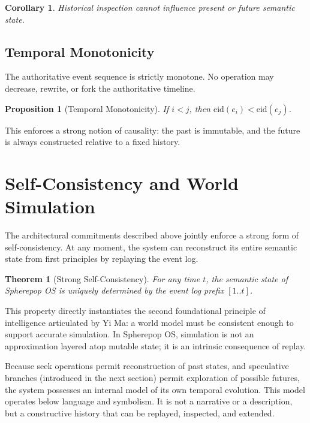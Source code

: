 \documentclass[11pt]{article}
\newtheorem{proposition}{Proposition}[section]
\newtheorem{theorem}{Theorem}[section]
\newtheorem{corollary}{Corollary}[section]
\begin{document}
\begin{corollary}
Historical inspection cannot influence present or future semantic state.
\end{corollary}

\subsection{Temporal Monotonicity}

The authoritative event sequence is strictly monotone. No operation may
decrease, rewrite, or fork the authoritative timeline.

\begin{proposition}[Temporal Monotonicity]
If $i < j$, then $\mathrm{eid}(e_i) < \mathrm{eid}(e_j)$.
\end{proposition}

This enforces a strong notion of causality: the past is immutable, and the
future is always constructed relative to a fixed history.

\section{Self-Consistency and World Simulation}

The architectural commitments described above jointly enforce a strong form
of self-consistency. At any moment, the system can reconstruct its entire
semantic state from first principles by replaying the event log.

\begin{theorem}[Strong Self-Consistency]
For any time $t$, the semantic state of Spherepop OS is uniquely determined
by the event log prefix $[1..t]$.
\end{theorem}

This property directly instantiates the second foundational principle of
intelligence articulated by Yi Ma: a world model must be consistent enough
to support accurate simulation. In Spherepop OS, simulation is not an
approximation layered atop mutable state; it is an intrinsic consequence of
replay.

Because seek operations permit reconstruction of past states, and
speculative branches (introduced in the next section) permit exploration of
possible futures, the system possesses an internal model of its own
temporal evolution. This model operates below language and symbolism. It is
not a narrative or a description, but a constructive history that can be
replayed, inspected, and extended.
\end{document}
